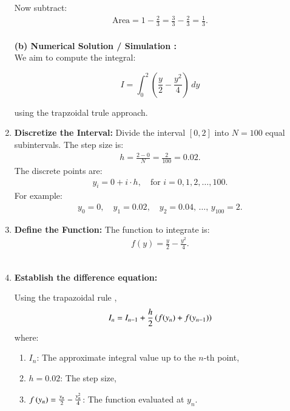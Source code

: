 \documentclass[journal]{IEEEtran}
\begin{document}
\begin{enumerate}
    Now subtract:
    \begin{align}
        \text{Area} = 1 - \frac{2}{3} = \frac{3}{3} - \frac{2}{3} = \frac{1}{3}.
    \end{align} \\
    
\textbf{(b) Numerical Solution / Simulation : } \\

We aim to compute the integral:

\[
I = \int_0^2 \left( \frac{y}{2} - \frac{y^2}{4} \right) \, dy
\]

using the trapzoidal trule approach. \\

    \item \textbf{Discretize the Interval:}  
    Divide the interval $[0, 2]$ into $N = 100$ equal subintervals. The step size is:
    \begin{align}
    h = \frac{2 - 0}{N} = \frac{2}{100} = 0.02.
    \end{align}
    The discrete points are:
    \begin{align}
    y_i = 0 + i \cdot h, \quad \text{for } i = 0, 1, 2, \dots, 100.
    \end{align}
    For example:
    \begin{align}
    y_0 = 0, \quad y_1 = 0.02, \quad y_2 = 0.04, \, \dots, \, y_{100} = 2.
    \end{align}

    \item \textbf{Define the Function:}  
    The function to integrate is:
    \begin{align}
    f(y) = \frac{y}{2} - \frac{y^2}{4}.
    \end{align} \\

    \item \textbf{Establish the difference equation:} 
    
    Using the trapazoidal rule , 
    \begin{align}
    I_{n} = I_{n-1} + \frac{h}{2} \left( f(y_n) + f(y_{n-1})\right) 
      \end{align}
    where:
    \begin{enumerate}
        \item $I_n$: The approximate integral value up to the $n$-th point,
        \item $h = 0.02$: The step size,
        \item $f\left(y_n\right) = \frac{y_n}{2} - \frac{y_n^2}{4}$: The function evaluated at $y_n$. \\
    \end{enumerate} 
   

\end{enumerate}
\end{document}
